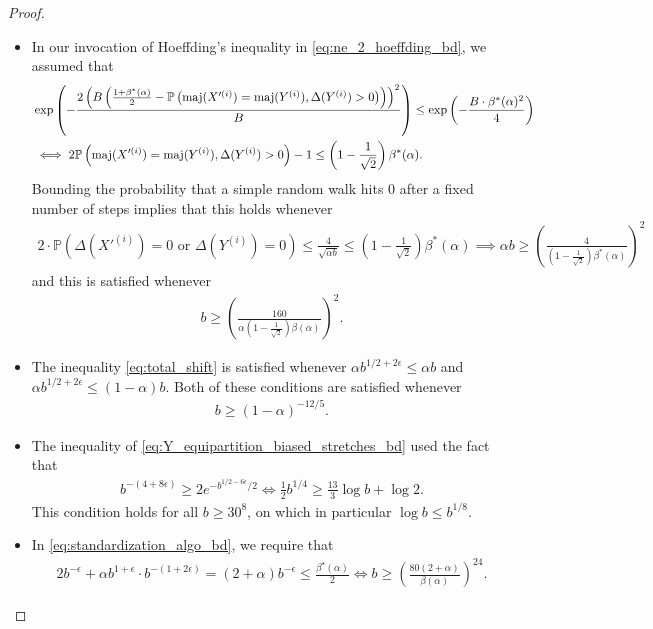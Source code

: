 \documentclass[11pt]{amsart}
\numberwithin{equation}{section}
\numberwithin{equation}{section}
\newcommand{\1}{\mathbbm{1}}
\newcommand{\Prob}{\mathbb{P}}
\newcommand{\maj}{\textup{maj}}
\theoremstyle{definition}
\begin{document}
\begin{appendices}
\begin{proof}
\begin{itemize}
        \item In our invocation of Hoeffding's inequality in \eqref{eq:ne_2_hoeffding_bd}, we assumed that
        \begin{align*}
            & \exp\left( -\frac{2\left( B\left( \frac{1+\beta^*(\alpha)}{2} - \Prob\left( \maj(X'^{(i)}) = \maj(Y^{(i)}), \Delta(Y^{(i)}) > 0  \right) \right) \right)^2}{B} \right) \leq \exp\left( -\frac{B \cdot \beta^*(\alpha)^2}{4} \right) \\
            & \iff 2\Prob\left( \maj(X'^{(i)}) = \maj(Y^{(i)}), \Delta(Y^{(i)}) > 0 \right) - 1 \leq \left( 1 - \frac{1}{\sqrt{2}} \right)\beta^*(\alpha).
        \end{align*}
        Bounding the probability that a simple random walk hits $0$ after a fixed number of steps implies that this holds whenever
        \begin{align*}
            2 \cdot \Prob\left( \Delta(X'^{(i)}) = 0 \text{ or } \Delta(Y^{(i)}) = 0 \right) \leq \frac{4}{\sqrt{\alpha b}} \leq \left( 1 - \frac{1}{\sqrt{2}} \right)\beta^*(\alpha) \implies \alpha b \geq \left( \frac{4}{\left( 1 - \frac{1}{\sqrt{2}}\right)\beta^*(\alpha)} \right)^2
        \end{align*}
        and this is satisfied whenever
        \begin{align*}
            b \geq \left( \frac{160}{\alpha\left( 1 - \frac{1}{\sqrt{2}}\right)\beta(\alpha)} \right)^2.
        \end{align*}

        \item The inequality \eqref{eq:total_shift} is satisfied whenever $\alpha b^{1/2+2\epsilon} \leq \alpha b$ and $\alpha b^{1/2+2\epsilon} \leq (1-\alpha) b$. Both of these conditions are satisfied whenever
        \begin{align*}
            b \geq \left(1-\alpha\right)^{-12/5}.
        \end{align*}

        \item The inequality of \eqref{eq:Y_equipartition_biased_stretches_bd} used the fact that
        \begin{align*}
            b^{-(4+8\epsilon)} \geq 2e^{-b^{1/2-6\epsilon}/2} \iff \frac{1}{2}b^{1/4} \geq \frac{13}{3}\log b + \log 2.
        \end{align*}
        This condition holds for all $b \geq 30^8$, on which in particular $\log b \leq b^{1/8}$.
    
        \item In \eqref{eq:standardization_algo_bd}, we require that
        \begin{align} \label{eq:biased_stretches_bd}
            2b^{-\epsilon} + \alpha b^{1+\epsilon} \cdot b^{-(1+2\epsilon)} = (2+\alpha)b^{-\epsilon} \leq \frac{\beta^\star(\alpha)}{2} \iff b \geq \left( \frac{80(2+\alpha)} {\beta(\alpha)} \right)^{24}.
        \end{align}
    

\end{itemize}
\end{proof}
\end{appendices}
\end{document}
